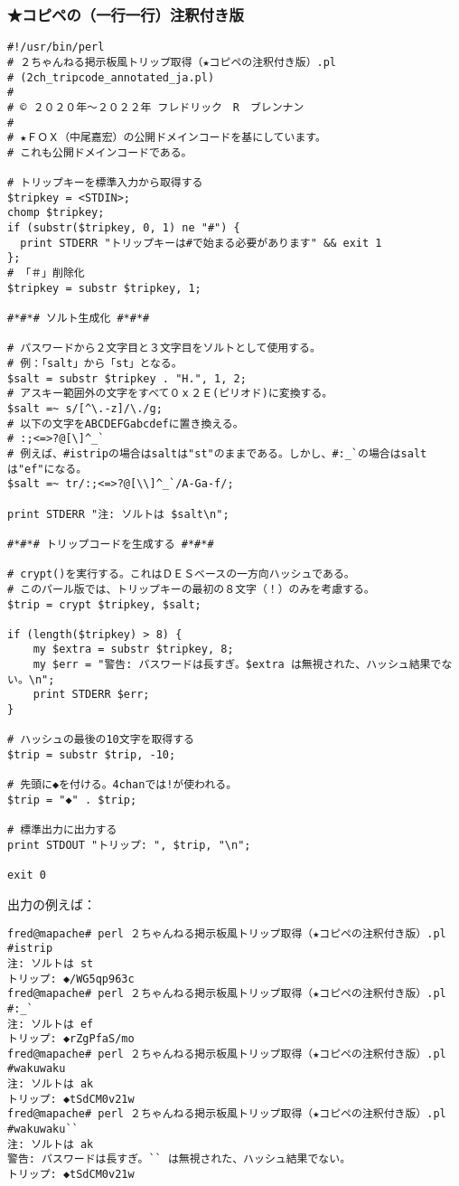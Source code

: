 \documentclass[lualatex, tate, landscape, paper=a4]{jlreq}
\newcommand{\kopipesan}{\hbox{\yoko ★}\hbox{コピペ}}
\begin{document}
\subsubsection{\kopipesan の（一行一行）注釈付き版}
\begin{verbatim}
#!/usr/bin/perl
# ２ちゃんねる掲示板風トリップ取得（★コピペの注釈付き版）.pl
# (2ch_tripcode_annotated_ja.pl)
#
# © ２０２０年〜２０２２年 フレドリック　R　ブレンナン
#
# ★ＦＯＸ（中尾嘉宏）の公開ドメインコードを基にしています。
# これも公開ドメインコードである。

# トリップキーを標準入力から取得する
$tripkey = <STDIN>;
chomp $tripkey;
if (substr($tripkey, 0, 1) ne "#") {
  print STDERR "トリップキーは#で始まる必要があります" && exit 1
};
# 「＃」削除化
$tripkey = substr $tripkey, 1;

#*#*# ソルト生成化 #*#*#

# パスワードから２文字目と３文字目をソルトとして使用する。
# 例：「salt」から「st」となる。
$salt = substr $tripkey . "H.", 1, 2;
# アスキー範囲外の文字をすべて０ｘ２Ｅ(ピリオド)に変換する。
$salt =~ s/[^\.-z]/\./g;
# 以下の文字をABCDEFGabcdefに置き換える。
# :;<=>?@[\]^_`
# 例えば、#istripの場合はsaltは"st"のままである。しかし、#:_`の場合はsaltは"ef"になる。
$salt =~ tr/:;<=>?@[\\]^_`/A-Ga-f/;

print STDERR "注: ソルトは $salt\n";

#*#*# トリップコードを生成する #*#*#

# crypt()を実行する。これはＤＥＳベースの一方向ハッシュである。
# このパール版では、トリップキーの最初の８文字（！）のみを考慮する。
$trip = crypt $tripkey, $salt;

if (length($tripkey) > 8) {
    my $extra = substr $tripkey, 8;
    my $err = "警告: パスワードは長すぎ。$extra は無視された、ハッシュ結果でない。\n";
    print STDERR $err;
}

# ハッシュの最後の10文字を取得する
$trip = substr $trip, -10;

# 先頭に◆を付ける。4chanでは!が使われる。
$trip = "◆" . $trip;

# 標準出力に出力する
print STDOUT "トリップ: ", $trip, "\n";

exit 0
\end{verbatim}

出力の例えば：

\begin{verbatim}
fred@mapache# perl ２ちゃんねる掲示板風トリップ取得（★コピペの注釈付き版）.pl
#istrip
注: ソルトは st
トリップ: ◆/WG5qp963c
fred@mapache# perl ２ちゃんねる掲示板風トリップ取得（★コピペの注釈付き版）.pl
#:_`
注: ソルトは ef
トリップ: ◆rZgPfaS/mo
fred@mapache# perl ２ちゃんねる掲示板風トリップ取得（★コピペの注釈付き版）.pl
#wakuwaku
注: ソルトは ak
トリップ: ◆tSdCM0v21w
fred@mapache# perl ２ちゃんねる掲示板風トリップ取得（★コピペの注釈付き版）.pl
#wakuwaku``
注: ソルトは ak
警告: パスワードは長すぎ。`` は無視された、ハッシュ結果でない。
トリップ: ◆tSdCM0v21w
\end{verbatim}
\end{document}
